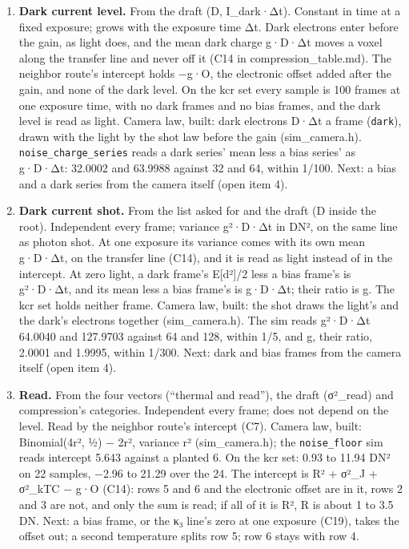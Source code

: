 \begin{enumerate}
\begin{itemize}
\end{itemize}
\item \textbf{Dark current level.} From the draft (D, I\_\allowbreak{}dark·Δt). Constant in time at a fixed exposure; grows with the exposure time Δt. Dark electrons enter before the gain, as light does, and the mean dark charge g·D·Δt moves a voxel along the transfer line and never off it (C14 in compression\_\allowbreak{}table.md). The neighbor route's intercept holds −g·O, the electronic offset added after the gain, and none of the dark level. On the kcr set every sample is 100 frames at one exposure time, with no dark frames and no bias frames, and the dark level is read as light. Camera law, built: dark electrons D·Δt a frame (\texttt{dark}), drawn with the light by the shot law before the gain (sim\_\allowbreak{}camera.h). \texttt{noise\_\allowbreak{}charge\_\allowbreak{}series} reads a dark series' mean less a bias series' as g·D·Δt: 32.0002 and 63.9988 against 32 and 64, within 1/100. Next: a bias and a dark series from the camera itself (open item 4).
\item \textbf{Dark current shot.} From the list asked for and the draft (D inside the root). Independent every frame; variance g²·D·Δt in DN², on the same line as photon shot. At one exposure its variance comes with its own mean g·D·Δt, on the transfer line (C14), and it is read as light instead of in the intercept. At zero light, a dark frame's E[d²]/2 less a bias frame's is g²·D·Δt, and its mean less a bias frame's is g·D·Δt; their ratio is g. The kcr set holds neither frame. Camera law, built: the shot draws the light's and the dark's electrons together (sim\_\allowbreak{}camera.h). The sim reads g²·D·Δt 64.0040 and 127.9703 against 64 and 128, within 1/5, and g, their ratio, 2.0001 and 1.9995, within 1/300. Next: dark and bias frames from the camera itself (open item 4).
\item \textbf{Read.} From the four vectors (“thermal and read”), the draft (σ²\_\allowbreak{}read) and compression's categories. Independent every frame; does not depend on the level. Read by the neighbor route's intercept (C7). Camera law, built: Binomial(4r², ½) − 2r², variance r² (sim\_\allowbreak{}camera.h); the \texttt{noise\_\allowbreak{}floor} sim reads intercept 5.643 against a planted 6. On the kcr set: 0.93 to 11.94 DN² on 22 samples, −2.96 to 21.29 over the 24. The intercept is R² + σ²\_\allowbreak{}J + σ²\_\allowbreak{}kTC − g·O (C14): rows 5 and 6 and the electronic offset are in it, rows 2 and 3 are not, and only the sum is read; if all of it is R², R is about 1 to 3.5 DN. Next: a bias frame, or the κ₃ line's zero at one exposure (C19), takes the offset out; a second temperature splits row 5; row 6 stays with row 4.

\end{enumerate}
